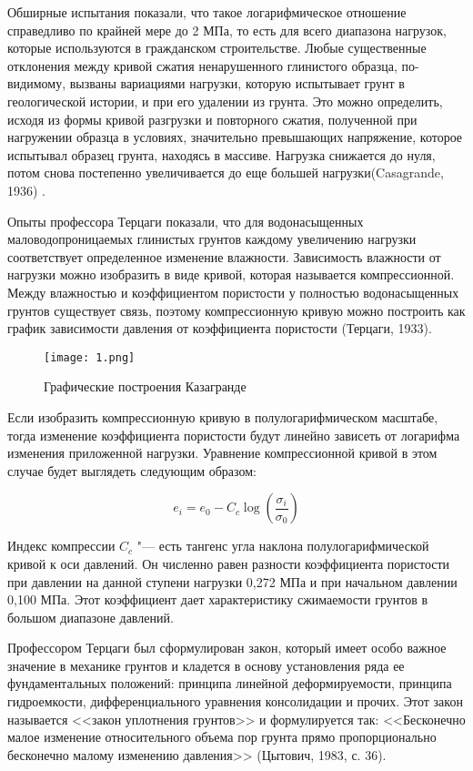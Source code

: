 Обширные испытания показали, что такое логарифмическое отношение справедливо по крайней мере до 2 МПа, то есть для всего диапазона нагрузок, которые используются в гражданском строительстве. Любые существенные отклонения между кривой сжатия ненарушенного глинистого образца, по-видимому, вызваны вариациями нагрузки, которую испытывает грунт в геологической истории, и при его удалении из грунта. Это можно определить, исходя из формы кривой разгрузки и повторного сжатия, полученной при нагружении образца в условиях, значительно превышающих напряжение, которое испытывал образец грунта, находясь в массиве. Нагрузка снижается до нуля, потом снова постепенно увеличивается до еще большей нагрузки(Casagrande, 1936) \cite{cazagrande1936}.
 
 Опыты профессора Терцаги показали, что для водонасыщенных маловодопроницаемых глинистых грунтов каждому увеличению нагрузки соответствует определенное изменение влажности. 
 Зависимость влажности от нагрузки можно изобразить в виде кривой, которая называется компрессионной. 
 Между влажностью и коэффициентом пористости у полностью водонасыщенных грунтов существует связь, поэтому компрессионную кривую можно построить как график зависимости давления от коэффициента пористости (Терцаги, 1933)\cite{terz1933}.

 \begin{figure}[h]
  \label{fig:ellipse}
  \centering
  \texttt{[image: 1.png]}
  \caption{Графические построения Казагранде \cite{cazagrande1936}}
 \end{figure}

 Если изобразить компрессионную кривую в полулогарифмическом масштабе, тогда изменение коэффициента пористости будут линейно зависеть от логарифма изменения приложенной нагрузки. Уравнение компрессионной кривой в этом случае будет выглядеть следующим образом:
 
 \begin{equation}
 e_i=e_0-C_c \log \left( \frac{\sigma_i}{\sigma_0} \right)
 \label{eq:ke}
 \end{equation}
 
 Индекс компрессии $C_c$ "--- есть тангенс угла наклона полулогарифмической кривой к оси давлений. Он численно равен разности коэффициента пористости при давлении на данной ступени нагрузки 0,272 МПа и при начальном давлении 0,100 МПа. Этот коэффициент дает характеристику сжимаемости грунтов в большом диапазоне давлений. 
 
 Профессором Терцаги был сформулирован закон, который имеет особо важное значение в механике грунтов и кладется в основу установления ряда ее фундаментальных положений: принципа линейной деформируемости, принципа гидроемкости, дифференциального уравнения консолидации и прочих. Этот закон называется <<закон уплотнения грунтов>> и формулируется так: <<Бесконечно малое изменение относительного объема пор грунта прямо пропорционально бесконечно малому изменению давления>> (Цытович, 1983, с. 36)\cite[36]{cytovich1983}.

